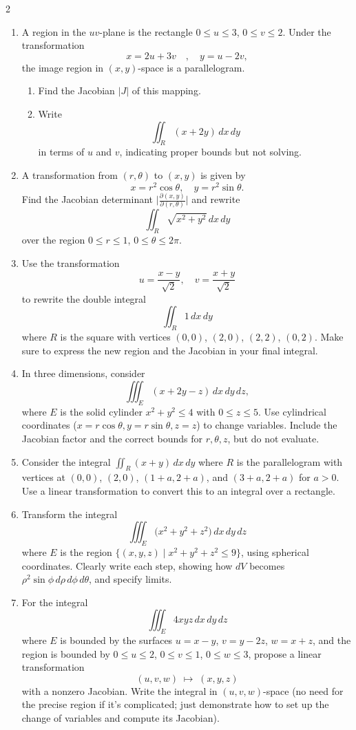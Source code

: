 \begin{multicols}{2}
\begin{enumerate}
\item A region in the $uv$-plane is the rectangle $0 \le u \le 3$, $0 \le v \le 2$. Under the transformation
\[
x = 2u + 3v \quad,\quad
y = u - 2v,
\]
the image region in $(x,y)$-space is a parallelogram.  
\begin{enumerate}
   \item Find the Jacobian $|J|$ of this mapping.  
   \item Write
   \[
   \iint_R (x + 2y)\,dx\,dy
   \]
   in terms of $u$ and $v$, indicating proper bounds but not solving.
\end{enumerate}

\item A transformation from $(r,\theta)$ to $(x,y)$ is given by
\[
x = r^2 \cos\theta, 
\quad
y = r^2 \sin\theta.
\]
Find the Jacobian determinant $\bigl|\tfrac{\partial(x,y)}{\partial(r,\theta)}\bigr|$ and rewrite
\[
\iint_R \sqrt{x^2 + y^2}\,dx\,dy
\]
over the region $0 \le r \le 1$, $0 \le \theta \le 2\pi$.

\item Use the transformation
\[
u = \frac{x-y}{\sqrt2}, 
\quad
v = \frac{x+y}{\sqrt2}
\]
to rewrite the double integral
\[
\iint_R 1\,dx\,dy
\]
where $R$ is the square with vertices $(0,0)$, $(2,0)$, $(2,2)$, $(0,2)$. Make sure to express the new region and the Jacobian in your final integral.

\item In three dimensions, consider
\[
\iiint_E (x+2y-z)\,dx\,dy\,dz,
\]
where $E$ is the solid cylinder $x^2 + y^2 \le 4$ with $0 \le z \le 5$. Use cylindrical coordinates ($x=r\cos\theta,y=r\sin\theta,z=z$) to change variables. Include the Jacobian factor and the correct bounds for $r,\theta,z$, but do not evaluate.

\item Consider the integral $\iint_R (x+y)\,dx\,dy$ where $R$ is the parallelogram with vertices at $(0,0)$, $(2,0)$, $(1+a,2+a)$, and $(3+a,2+a)$ for $a>0$. Use a linear transformation to convert this to an integral over a rectangle.

\item Transform the integral
\[
\iiint_E \bigl(x^2 + y^2 + z^2\bigr) \,dx\,dy\,dz
\]
where $E$ is the region $\{(x,y,z) \mid x^2 + y^2 + z^2 \le 9\}$, using spherical coordinates. Clearly write each step, showing how $dV$ becomes $\rho^2\sin\phi\,d\rho\,d\phi\,d\theta$, and specify limits.

\item For the integral
\[
\iiint_E 4xyz \,dx\,dy\,dz
\]
where $E$ is bounded by the surfaces $u=x-y$, $v=y-2z$, $w=x+z$, and the region is bounded by $0 \leq u \leq 2$, $0 \leq v \leq 1$, $0 \leq w \leq 3$, propose a linear transformation 
\[
(u,v,w) \;\mapsto\; (x,y,z)
\]
with a nonzero Jacobian. Write the integral in $(u,v,w)$-space (no need for the precise region if it’s complicated; just demonstrate how to set up the change of variables and compute its Jacobian).


\end{enumerate}
\end{multicols}
